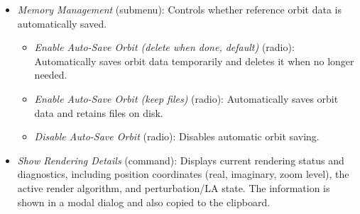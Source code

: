 \begin{itemize}
\begin{itemize}
      \item \emph{Create Random Palette} (command): Generates a new random palette.

      \item \emph{5-bit} (radio)
      \item \emph{6-bit} (radio)
      \item \emph{8-bit} (radio)
      \item \emph{12-bit} (radio)
      \item \emph{16-bit} (radio)
      \item \emph{20-bit} (radio)

      \item \emph{Palette Rotation} (command): Enters an interactive rotation
      mode through the shared presentation path on Windows and Linux. The
      palette shifts by 10~units per frame while the current iteration buffer
      is recolored continuously. Holding  for approximately
      three seconds exits the mode and resets the palette to its original
      state. This command is useful for quickly previewing how different color
      offsets look without recomputing the fractal geometry.
    \end{itemize}

  \item \emph{Memory Management} (submenu): Controls whether reference orbit
    data is automatically saved.
    \begin{itemize}
      \item \emph{Enable Auto-Save Orbit (delete when done, default)} (radio):
      Automatically saves orbit data temporarily and deletes it when no longer
      needed.
      \item \emph{Enable Auto-Save Orbit (keep files)} (radio): Automatically
      saves orbit data and retains files on disk.
      \item \emph{Disable Auto-Save Orbit} (radio): Disables automatic orbit saving.
    \end{itemize}

  \item \emph{Show Rendering Details} (command): Displays current rendering
  status and diagnostics, including position coordinates (real, imaginary,
  zoom level), the active render algorithm, and perturbation/LA state.
  The information is shown in a modal dialog and also copied to the clipboard.


\end{itemize}
